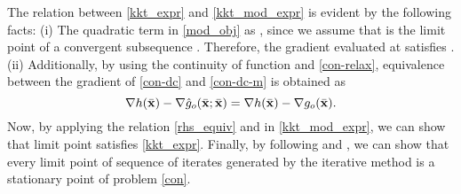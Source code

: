 The relation between \eqref{kkt_expr} and \eqref{kkt_mod_expr} is evident by the following facts: (i) The quadratic term in \eqref{mod_obj}   as , since we assume that \eqn{\bar{\ma}} is the limit point of a convergent subsequence . Therefore, the gradient evaluated at \eqn{\bar{\ma}} satisfies . (ii) Additionally, by using the continuity of function  and \eqref{con-relax}, equivalence between the gradient of \eqref{con-dc} and \eqref{con-dc-m} is obtained as 
\begin{equation} \label{rhs_equiv}
\nabla h(\bar{\ma}) - \nabla \hat{g}_o(\bar{\ma};\bar{\ma}) = \nabla h(\bar{\ma}) - \nabla g_o(\bar{\ma}).
\end{equation}
Now, by applying the relation \eqref{rhs_equiv} and  in \eqref{kkt_mod_expr}, we can show that limit point \eqn{\bar{\ma}} satisfies \eqref{kkt_expr}. Finally, by following \cite[Thm. 2]{scutari_1} and \cite[Prop. 3.2]{amir}, we can show that every limit point of sequence of iterates  generated by the iterative method is a stationary point of problem \eqref{con}.







